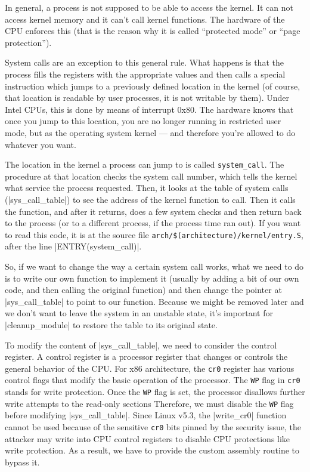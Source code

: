 \documentclass[10pt, oneside]{book}
\begin{document}
In general, a process is not supposed to be able to access the kernel.
It can not access kernel memory and it can't call kernel functions.
The hardware of the CPU enforces this (that is the reason why it is called ``protected mode'' or ``page protection'').

System calls are an exception to this general rule.
What happens is that the process fills the registers with the appropriate values and then calls a special instruction which jumps to a previously defined location in the kernel (of course, that location is readable by user processes, it is not writable by them).
Under Intel CPUs, this is done by means of interrupt 0x80. The hardware knows that once you jump to this location, you are no longer running in restricted user mode, but as the operating system kernel --- and therefore you're allowed to do whatever you want.

The location in the kernel a process can jump to is called \verb|system_call|.
The procedure at that location checks the system call number, which tells the kernel what service the process requested.
Then, it looks at the table of system calls (\cpp|sys_call_table|) to see the address of the kernel function to call.
Then it calls the function, and after it returns, does a few system checks and then return back to the process (or to a different process, if the process time ran out).
If you want to read this code, it is at the source file \verb|arch/$(architecture)/kernel/entry.S|, after the line \cpp|ENTRY(system_call)|.

So, if we want to change the way a certain system call works, what we need to do is to write our own function to implement it (usually by adding a bit of our own code, and then calling the original function) and then change the pointer at \cpp|sys_call_table| to point to our function.
Because we might be removed later and we don't want to leave the system in an unstable state, it's important for \cpp|cleanup_module| to restore the table to its original state.

To modify the content of \cpp|sys_call_table|, we need to consider the control register.
A control register is a processor register that changes or controls the general behavior of the CPU.
For x86 architecture, the \verb|cr0| register has various control flags that modify the basic operation of the processor.
The \verb|WP| flag in \verb|cr0| stands for write protection.
Once the \verb|WP| flag is set, the processor disallows further write attempts to the read-only sections
Therefore, we must disable the \verb|WP| flag before modifying \cpp|sys_call_table|.
Since Linux v5.3, the \cpp|write_cr0| function cannot be used because of the sensitive \verb|cr0| bits pinned by the security issue, the attacker may write into CPU control registers to disable CPU protections like write protection.
As a result, we have to provide the custom assembly routine to bypass it.
\end{document}
